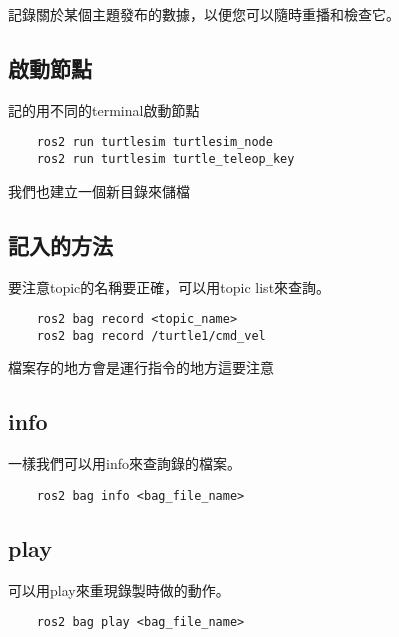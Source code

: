 記錄關於某個主題發布的數據，以便您可以隨時重播和檢查它。

\subsection{啟動節點}
記的用不同的terminal啟動節點
\begin{verbatim}
    ros2 run turtlesim turtlesim_node
    ros2 run turtlesim turtle_teleop_key
\end{verbatim}
我們也建立一個新目錄來儲檔

\subsection{記入的方法}
要注意topic的名稱要正確，可以用topic list來查詢。
\begin{verbatim}
    ros2 bag record <topic_name>
    ros2 bag record /turtle1/cmd_vel
\end{verbatim}

檔案存的地方會是運行指令的地方這要注意

\subsection{info}
一樣我們可以用info來查詢錄的檔案。

\begin{verbatim}
    ros2 bag info <bag_file_name>
\end{verbatim}
\subsection{play}
可以用play來重現錄製時做的動作。
\begin{verbatim}
    ros2 bag play <bag_file_name>
\end{verbatim}
